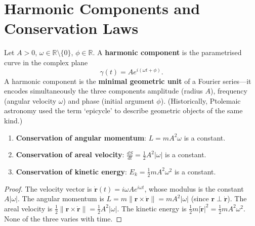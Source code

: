 \section{Harmonic Components and Conservation Laws}

\begin{definition}\label{def:harmonic_component}
Let $A > 0$, $\omega \in \mathbb{R}\setminus\{0\}$, $\phi \in \mathbb{R}$. A \textbf{harmonic component} is the parametrised curve in the complex plane
\[
\gamma(t) = A e^{i(\omega t + \phi)}.
\]
A harmonic component is the \textbf{minimal geometric unit} of a Fourier series---it encodes simultaneously the three components amplitude (radius $A$), frequency (angular velocity $\omega$) and phase (initial argument $\phi$). (Historically, Ptolemaic astronomy used the term `epicycle' to describe geometric objects of the same kind.)
\end{definition}

\begin{theorem}\label{thm:harmonic_three_conservations}
\begin{enumerate}[label=(\roman*)]
    \item \textbf{Conservation of angular momentum}: $L = m A^2 \omega$ is a constant.
    \item \textbf{Conservation of areal velocity}: $\frac{dS}{dt} = \frac{1}{2}A^2|\omega|$ is a constant.
    \item \textbf{Conservation of kinetic energy}: $E_k = \frac{1}{2}m A^2 \omega^2$ is a constant.
\end{enumerate}
\end{theorem}

\begin{proof}
The velocity vector is $\dot{\mathbf{r}}(t) = i\omega A e^{i\omega t}$, whose modulus is the constant $A|\omega|$. The angular momentum is $L = m\|\mathbf{r} \times \dot{\mathbf{r}}\| = mA^2|\omega|$ (since $\mathbf{r} \perp \dot{\mathbf{r}}$). The areal velocity is $\frac{1}{2}\|\mathbf{r}\times\dot{\mathbf{r}}\| = \frac12 A^2|\omega|$. The kinetic energy is $\frac12 m|\dot{\mathbf{r}}|^2 = \frac12 mA^2\omega^2$. None of the three varies with time.
\end{proof}

